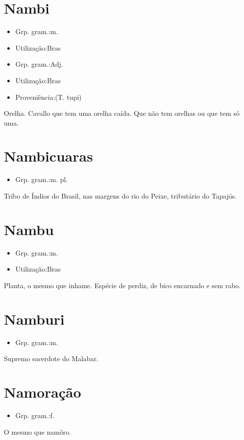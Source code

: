 \section{Nambi}
\begin{itemize}
\item {Grp. gram.:m.}
\end{itemize}
\begin{itemize}
\item {Utilização:Bras}
\end{itemize}
\begin{itemize}
\item {Grp. gram.:Adj.}
\end{itemize}
\begin{itemize}
\item {Utilização:Bras}
\end{itemize}
\begin{itemize}
\item {Proveniência:(T. tupi)}
\end{itemize}
Orelha.
Cavallo que tem uma orelha caída.
Que não tem orelhas ou que tem só uma.
\section{Nambicuaras}
\begin{itemize}
\item {Grp. gram.:m. pl.}
\end{itemize}
Tríbo de Índios do Brasil, nas margens do rio do Peixe, tributário do Tapajós.
\section{Nambu}
\begin{itemize}
\item {Grp. gram.:m.}
\end{itemize}
\begin{itemize}
\item {Utilização:Bras}
\end{itemize}
Planta, o mesmo que \textunderscore inhame\textunderscore .
Espécie de perdiz, de bico encarnado e sem rabo.
\section{Namburi}
\begin{itemize}
\item {Grp. gram.:m.}
\end{itemize}
Supremo sacerdote do Malabar.
\section{Namoração}
\begin{itemize}
\item {Grp. gram.:f.}
\end{itemize}
O mesmo que \textunderscore namôro\textunderscore .
